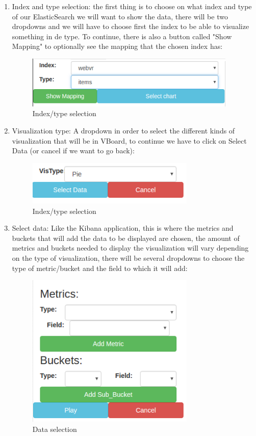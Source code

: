\documentclass[a4paper, 12pt]{book}
\begin{document}
\begin{enumerate}
    \item Index and type selection: the first thing is to choose on what index and type of our ElasticSearch we will want to show the data, there will be two dropdowns and we will have to choose first the index to be able to visualize something in de type. To continue, there is also a button called "Show Mapping" to optionally see the mapping that the chosen index has:
        \begin{figure}[H]
          \centering
          \includegraphics[width=10cm, keepaspectratio]{img/development/indextype}
          \caption{Index/type selection}
          \label{fig:index-type}
        \end{figure}
    \item Visualization type: A dropdown in order to select the different kinds of visualization that will be in VBoard, to continue we have to click on Select Data (or cancel if we want to go back):
        \begin{figure}[H]
          \centering
          \includegraphics[width=8cm, keepaspectratio]{img/development/vistype}
          \caption{Index/type selection}
          \label{fig:vistype}
        \end{figure}
    \item Select data: Like the Kibana application, this is where the metrics and buckets that will add the data to be displayed are chosen, the amount of metrics and buckets needed to display the visualization will vary depending on the type of visualization, there will be several dropdowns to choose the type of metric/bucket and the field to which it will add:
    \begin{figure}[H]
      \centering
      \includegraphics[width=8cm, keepaspectratio]{img/development/aggregationstype}
      \caption{Data selection}
      \label{fig:aggregationstype}
    \end{figure}
\end{enumerate}
\end{document}
